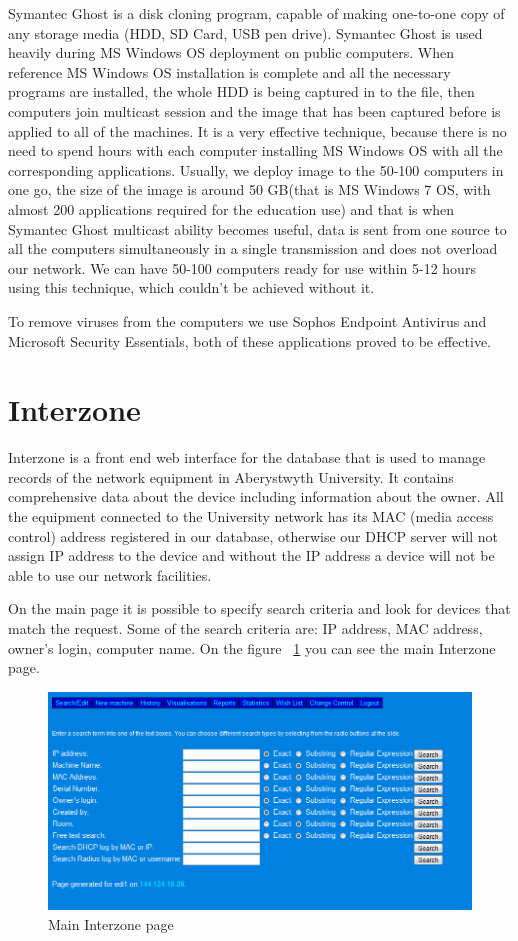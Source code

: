 \documentclass[10pt,a4paper,headinclude=true,twoside]{report}
\begin{document}
Symantec Ghost is a disk cloning program, capable of making one-to-one copy of any storage media (HDD, SD Card, USB pen drive). Symantec Ghost is used heavily during MS Windows OS deployment on public computers. When reference MS Windows OS installation is complete and all the necessary programs are installed, the whole HDD is being captured in to the file, then computers join multicast session and the image that has been captured before is applied to all of the machines. It is a very effective technique, because there is no need to spend hours with each computer installing MS Windows OS with all the corresponding applications. Usually, we deploy image to the 50-100 computers in one go, the size of the image is around 50 GB(that is MS Windows 7 OS, with almost 200 applications required for the education use) and that is when Symantec Ghost multicast ability becomes useful, data is sent from one source to all the computers simultaneously in a single transmission and does not overload our network. We can have 50-100 computers ready for use within 5-12 hours using this technique, which couldn't be achieved without it.

To remove viruses from the computers we use Sophos Endpoint Antivirus and Microsoft Security Essentials, both of these applications proved to be effective.
 
\section{Interzone}
Interzone is a front end web interface for the database that is used to manage records of the network equipment in Aberystwyth University. It contains comprehensive data about the device including information about the owner. All the equipment connected to the University network has its MAC (media access control) address registered in our database, otherwise our DHCP server will not assign IP address to the device and without the IP address a device will not be able to use our network facilities.

On the main page it is possible to specify search criteria and look for devices that match the request. Some of the search criteria are: IP address, MAC address, owner's login, computer name. On the figure ~\ref{fig:main_interzone_page} you can see the main Interzone page.

\begin{figure}[H]
\centering
\centerline{\includegraphics[scale=0.5]{./main_interzone_page}}
\caption{Main Interzone page}
\label{fig:main_interzone_page}
\end{figure}
\end{document}

